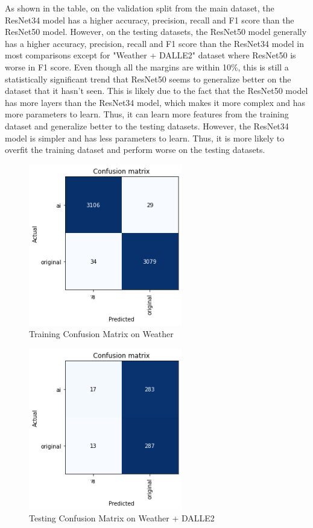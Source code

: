 \documentclass[11pt]{article}
\begin{document}
As shown in the table, on the validation split from the main dataset, the ResNet34 model has a higher accuracy, precision, recall and F1 score than the ResNet50 model. However, on the testing datasets, the ResNet50 model generally has a higher accuracy, precision, recall and F1 score than the ResNet34 model in most comparisons except for "Weather + DALLE2" dataset where ResNet50 is worse in F1 score. Even though all the margins are within 10\%, this is still a statistically significant trend that ResNet50 seems to generalize better on the dataset that it hasn't seen. This is likely due to the fact that the ResNet50 model has more layers than the ResNet34 model, which makes it more complex and has more parameters to learn. Thus, it can learn more features from the training dataset and generalize better to the testing datasets. However, the ResNet34 model is simpler and has less parameters to learn. Thus, it is more likely to overfit the training dataset and perform worse on the testing datasets.

\begin{figure}[ht]
  \includegraphics[width=190pt]{./assets/paper_training_confusion_matrix.png}
  \caption{Training Confusion Matrix on Weather}
  \label{fig:paper_training_confusion_matrix}
\end{figure}

\begin{figure}[ht]
  \includegraphics[width=190pt]{./assets/paper_dalle2_weather_confusion_matrix.png}
  \caption{Testing Confusion Matrix on Weather + DALLE2}
  \label{fig:paper_dalle2_weather_confusion_matrix}
\end{figure}
\end{document}
